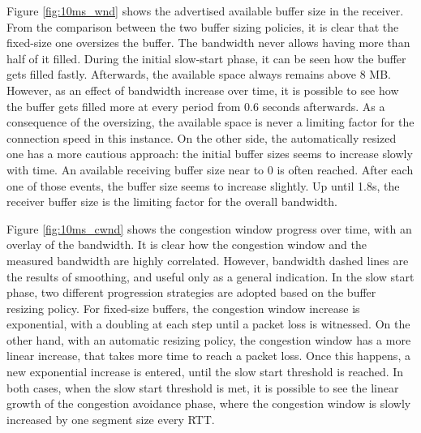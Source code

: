 \documentclass[a4paper,10pt]{article}
\begin{document}
Figure \ref{fig:10ms_wnd} shows the advertised available buffer size in the receiver. From the comparison between the two buffer sizing policies, it is clear that the fixed-size one oversizes the buffer. The bandwidth never allows having more than half of it filled. During the initial slow-start phase, it can be seen how the buffer gets filled fastly. Afterwards, the available space always remains above 8 MB. However, as an effect of bandwidth increase over time, it is possible to see how the buffer gets filled more at every period from 0.6 seconds afterwards. As a consequence of the oversizing, the available space is never a limiting factor for the connection speed in this instance. 
On the other side, the automatically resized one has a more cautious approach: the initial buffer sizes seems to increase slowly with time. An available receiving buffer size near to 0 is often reached. After each one of those events, the buffer size seems to increase slightly. Up until 1.8s, the receiver buffer size is the limiting factor for the overall bandwidth. 

Figure \ref{fig:10ms_cwnd} shows the congestion window progress over time, with an overlay of the bandwidth. It is clear how the congestion window and the measured bandwidth are highly correlated. However, bandwidth dashed lines are the results of smoothing, and useful only as a general indication. In the slow start phase, two different progression strategies are adopted based on the buffer resizing policy. For fixed-size buffers, the congestion window increase is exponential, with a doubling at each step until a packet loss is witnessed. On the other hand, with an automatic resizing policy, the congestion window has a more linear increase, that takes more time to reach a packet loss. Once this happens, a new exponential increase is entered, until the slow start threshold is reached.
In both cases, when the slow start threshold is met, it is possible to see the linear growth of the congestion avoidance phase, where the congestion window is slowly increased by one segment size every RTT.
\end{document}
